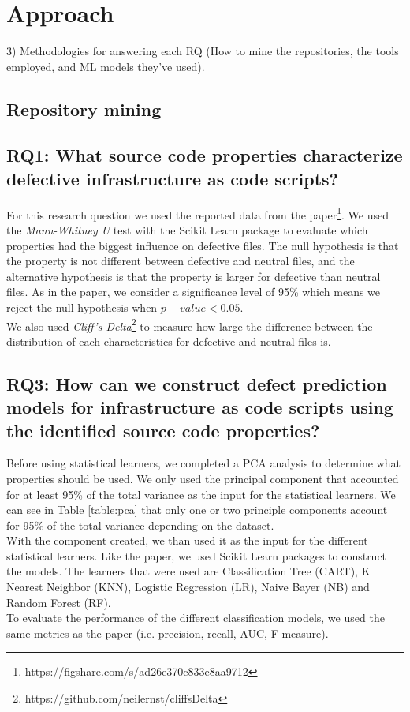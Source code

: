 
\section{Approach}
3) Methodologies for answering each RQ (How to mine the repositories, the tools employed, and ML models they've used).
\subsection{Repository mining}
\subsection{RQ1: What source code properties characterize defective infrastructure as code scripts?}
For this research question we used the reported data from the 
paper\footnote{https://figshare.com/s/ad26e370c833e8aa9712}.
We used the \emph{Mann-Whitney U} test with the Scikit Learn package
to evaluate which properties had the biggest influence on defective files. 
The null hypothesis is that the property is not different between defective and 
neutral files, and the alternative hypothesis is that the property is larger for 
defective than neutral files. As in the paper, we consider a significance level of 
95\% which means we reject the null hypothesis when $ p-value < 0.05 $. \\

We also used \emph{Cliff's Delta}\footnote{https://github.com/neilernst/cliffsDelta}
to measure how large the difference between the distribution of each characteristics
for defective and neutral files is. 

\subsection{RQ3: How can we construct defect prediction models for 
infrastructure as code scripts using the identified source code properties?}
Before using statistical learners, we completed a PCA analysis to determine 
what properties should be used. We only used the principal component that accounted
for at least 95\% of the total variance as the input for the statistical learners.
We can see in Table \ref{table:pca} that only one or two principle components 
account for 95\% of the total variance depending on the dataset. \\

With the component created, we than used it as the input for the different
statistical learners. Like the paper, we used Scikit Learn packages to construct
the models. The learners that were used are Classification Tree (CART),
K Nearest Neighbor (KNN), Logistic Regression (LR), Naive Bayer (NB) and 
Random Forest (RF). \\

To evaluate the performance of the different classification models, we used the 
same metrics as the paper (i.e. precision, recall, AUC, F-measure).
